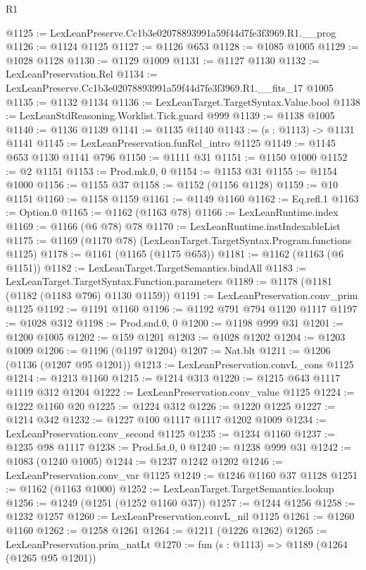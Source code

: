 \begin{lexlean}{R1}
\begin{coremodule}
@1125 := LexLeanPreserve.Cc1b3e02078893991a59f44d7fe3f3969.R1.__prog
@1126 := @1124 @1125
@1127 := @1126 @653
@1128 := @1085 @1005
@1129 := @1028 @1128
@1130 := @1129 @1009
@1131 := @1127 @1130
@1132 := LexLeanPreservation.Rel
@1134 := LexLeanPreserve.Cc1b3e02078893991a59f44d7fe3f3969.R1.__fits_17 @1005
@1135 := @1132 @1134
@1136 := LexLeanTarget.TargetSyntax.Value.bool
@1138 := LexLeanStdReasoning.Worklist.Tick.guard @999
@1139 := @1138 @1005
@1140 := @1136 @1139
@1141 := @1135 @1140
@1143 := (s : @1113) -> @1131 @1141
@1145 := LexLeanPreservation.funRel_intro @1125
@1149 := @1145 @653 @1130 @1141 @796
@1150 := @1111 @31
@1151 := @1150 @1000
@1152 := @2 @1151
@1153 := Prod.mk.{0, 0}
@1154 := @1153 @31
@1155 := @1154 @1000
@1156 := @1155 @37
@1158 := @1152 (@1156 @1128)
@1159 := @10 @1151
@1160 := @1158 @1159
@1161 := @1149 @1160
@1162 := Eq.refl.{1}
@1163 := Option.{0}
@1165 := @1162 (@1163 @78)
@1166 := LexLeanRuntime.index
@1169 := @1166 (@6 @78) @78
@1170 := LexLeanRuntime.instIndexableList
@1175 := @1169 (@1170 @78) (LexLeanTarget.TargetSyntax.Program.functions @1125)
@1178 := @1161 (@1165 (@1175 @653))
@1181 := @1162 (@1163 (@6 @1151))
@1182 := LexLeanTarget.TargetSemantics.bindAll
@1183 := LexLeanTarget.TargetSyntax.Function.parameters
@1189 := @1178 (@1181 (@1182 (@1183 @796) @1130 @1159))
@1191 := LexLeanPreservation.conv_prim @1125
@1192 := @1191 @1160
@1196 := @1192 @791 @794 @1120 @1117
@1197 := @1028 @312
@1198 := Prod.snd.{0, 0}
@1200 := @1198 @999 @31
@1201 := @1200 @1005
@1202 := @159 @1201
@1203 := @1028 @1202
@1204 := @1203 @1009
@1206 := @1196 (@1197 @1204)
@1207 := Nat.blt
@1211 := @1206 (@1136 (@1207 @95 @1201))
@1213 := LexLeanPreservation.convL_cons @1125
@1214 := @1213 @1160
@1215 := @1214 @313
@1220 := @1215 @643 @1117 @1119 @312 @1204
@1222 := LexLeanPreservation.conv_value @1125
@1224 := @1222 @1160 @20
@1225 := @1224 @312
@1226 := @1220 @1225
@1227 := @1214 @342
@1232 := @1227 @100 @1117 @1117 @1202 @1009
@1234 := LexLeanPreservation.conv_second @1125
@1235 := @1234 @1160
@1237 := @1235 @98 @1117
@1238 := Prod.fst.{0, 0}
@1240 := @1238 @999 @31
@1242 := @1083 (@1240 @1005)
@1244 := @1237 @1242 @1202
@1246 := LexLeanPreservation.conv_var @1125
@1249 := @1246 @1160 @37 @1128
@1251 := @1162 (@1163 @1000)
@1252 := LexLeanTarget.TargetSemantics.lookup
@1256 := @1249 (@1251 (@1252 @1160 @37))
@1257 := @1244 @1256
@1258 := @1232 @1257
@1260 := LexLeanPreservation.convL_nil @1125
@1261 := @1260 @1160
@1262 := @1258 @1261
@1264 := @1211 (@1226 @1262)
@1265 := LexLeanPreservation.prim_natLt
@1270 := fun (s : @1113) => @1189 (@1264 (@1265 @95 @1201))

\end{coremodule}
\end{lexlean}
